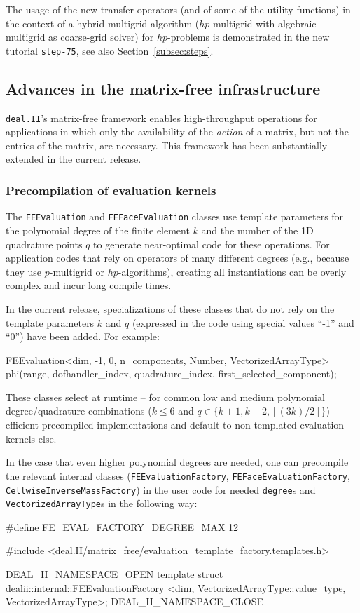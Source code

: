 \documentclass{ansarticle-preprint}
\newcommand{\specialword}[1]{\texttt{#1}}
\newcommand{\dealii}{{\specialword{deal.II}}\xspace}
\begin{document}
The usage of the new transfer operators (and of some of the utility
functions) in the context of a hybrid multigrid algorithm
($hp$-multigrid with algebraic multigrid as coarse-grid solver) for $hp$-problems is demonstrated in the new tutorial \texttt{step-75}, see also Section~\ref{subsec:steps}.



\subsection{Advances in the matrix-free infrastructure}
\label{subsec:mf}

\dealii{}'s matrix-free framework enables high-throughput operations
for applications in which only the availability of the \textit{action}
of a matrix, but not the entries of the matrix, are necessary. This
framework has been substantially extended in the current release.


\subsubsection{Precompilation of evaluation kernels}

The \texttt{FEEvaluation} and \texttt{FEFaceEvaluation} classes use template parameters for
the polynomial degree of the finite element $k$ and the number of the 1D quadrature points $q$
to generate near-optimal code for these operations.
For application codes that rely on operators of many different degrees (e.g., because
they use $p$-multigrid or $hp$-algorithms), creating all instantiations
can be overly complex and incur long compile times.

In the current release, specializations of these classes that do
not rely on the template parameters $k$ and $q$ (expressed in the code
using special values ``-1'' and ``0'') have been added. For example:
\begin{c++}
FEEvaluation<dim, -1, 0, n_components, Number, VectorizedArrayType>
  phi(range, dofhandler_index, quadrature_index, first_selected_component);
\end{c++}
These classes select at runtime -- for common low and medium
polynomial degree/quadrature combinations ($k\le 6$ and $q\in\{ k+1,
k+2, \left\lfloor (3k)/2 \right\rfloor \}$) -- efficient precompiled implementations and default to non-templated
evaluation kernels else.

In the case that even higher polynomial degrees are needed, one can precompile the
relevant internal classes
(\texttt{FEEvaluationFactory}, \texttt{FEFaceEvaluationFactory}, \texttt{CellwiseInverseMassFactory}) in the user code for needed \texttt{degree}s
and \texttt{VectorizedArrayType}s in the following way:
\begin{c++}
#define FE_EVAL_FACTORY_DEGREE_MAX 12

#include <deal.II/matrix_free/evaluation_template_factory.templates.h>

DEAL_II_NAMESPACE_OPEN
template struct dealii::internal::FEEvaluationFactory
  <dim, VectorizedArrayType::value_type, VectorizedArrayType>;
DEAL_II_NAMESPACE_CLOSE
\end{c++}
\end{document}
